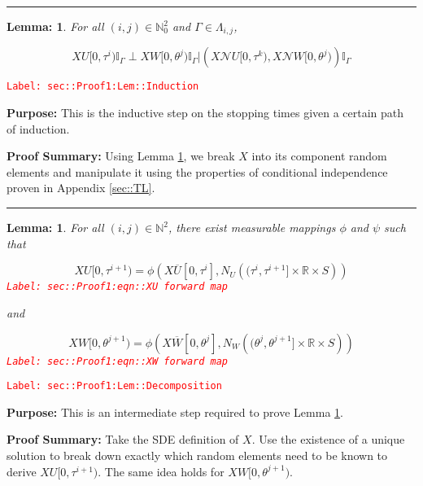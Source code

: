 \documentclass[12pt]{article}
\newcommand{\mb}{\mathbb}
\newcommand{\mc}{\mathcal}
\newcommand{\ov}{\overline}
\newcommand{\tr}{\textcolor{red}}
\newcommand{\labe}[1]{\tr{\texttt{Label: #1}}}
\newcommand{\purpose}{\textbf{Purpose: }}
\newcommand{\pfsum}{\textbf{Proof Summary: }}
\newcommand{\lin}{\rule{\linewidth}{0.4 pt}}
\renewcommand{\U}{U}							%
\newcommand{\UU}{W}								%
\renewcommand{\S}{S}							%
\newcommand{\X}{X}								%
\newcommand{\neigh}{\mc{N}}						%
\newcommand{\cl}{\ov}							%
\newcommand{\poiss}[1]{N_{#1}}						%
\newcommand{\rt}[1]{\tau^{#1}}						%
\newcommand{\rtt}[1]{\theta^{#1}}					%
\renewcommand{\it}{k}								%
\newcommand{\itt}{i}								%
\newcommand{\ittt}{j}								%
\newcommand{\apath}{\Gamma}						%
\newcommand{\pathset}[2]{\Lambda_{#1,#2}}			%
\newtheorem{lem}[thms]{Lemma: }
\begin{document}
\lin

\begin{lem}
For all \((\itt,\ittt)\in \mb{N}_0^2\) and \(\apath \in \pathset{\itt}{\ittt}\),

\[\X{\U}{[0,\rt{\itt})}\mb{I}_{\apath}\perp \X{\UU}{[0,\rtt{\ittt})}\mb{I}_{\apath}|\left(\X{\neigh{\U}}{[0,\rt{\it})},\X{\neigh{\UU}}{[0,\rtt{\ittt})}\right)\mb{I}_{\apath}\]
\label{sec::Proof1:Lem::Induction}
\end{lem}
\labe{sec::Proof1:Lem::Induction}

\purpose This is the inductive step on the stopping times given a certain path of induction.

\pfsum Using Lemma \ref{sec::Proof1:Lem::Decomposition}, we break \(\X{}{}\) into its component random elements and manipulate it using the properties of conditional independence proven in Appendix \ref{sec::TL}.

\lin

\begin{lem}
For all \((\itt,\ittt)\in \mb{N}^2\), there exist measurable mappings \(\phi\) and \(\psi\) such that 

\begin{equation}
\X{\U}{[0,\rt{\itt+1})} = \phi\left(\X{\cl{\U}}{[0,\rt{\itt}]}, \poiss{\U}\left((\rt{\itt}, \rt{\itt+1}]\times \mb{R}\times \S\right)\right)
\label{sec::Proof1:eqn::XU forward map}
\end{equation}
\labe{sec::Proof1:eqn::XU forward map}

and

\begin{equation}
\X{\UU}{[0,\rtt{\ittt+1})} = \phi\left(\X{\cl{\UU}}{[0,\rtt{\ittt}]}, \poiss{\UU}\left((\rtt{\ittt}, \rtt{\ittt+1}]\times \mb{R}\times \S\right)\right)
\label{sec::Proof1:eqn::XW forward map}
\end{equation}
\labe{sec::Proof1:eqn::XW forward map}

\label{sec::Proof1:Lem::Decomposition}
\end{lem}
\labe{sec::Proof1:Lem::Decomposition}

\purpose This is an intermediate step required to prove Lemma \ref{sec::Proof1:Lem::Induction}.

\pfsum Take the SDE definition of \(\X{}{}\). Use the existence of a unique solution to break down exactly which random elements need to be known to derive \(\X{\U}{[0,\rt{\itt+1})}\). The same idea holds for \(\X{\UU}{[0,\rtt{\ittt+1})}\).
\end{document}
